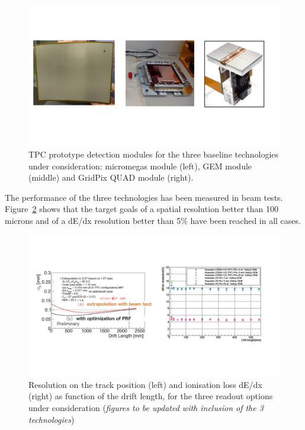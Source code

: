 \begin{figure}[t!]
\centering
\includegraphics[width=1.0\hsize]{Detector/fig/TPC_prototypes.jpg}
\caption{TPC prototype detection modules for the three baseline technologies under consideration: micromegas module (left), GEM module (middle) and GridPix QUAD module (right).}
\label{fig:det:TPC_prototypes}
\end{figure}

The performance of the three technologies has been measured in beam tests. Figure~\ref{fig:det:TPC_performance} shows that the target goals of a spatial resolution better than 100 microns and of a dE/dx resolution better than 5\% have been reached in all cases.   

\begin{figure}[t!]
\centering
\includegraphics[width=1.0\hsize]{Detector/fig/TPC_performance.jpg}
\caption{Resolution on the track position (left) and ionisation loss dE/dx (right) as function of the drift length, for the three readout options under consideration (\textit{figures to be updated with inclusion of the 3 technologies})}
\label{fig:det:TPC_performance}
\end{figure}

